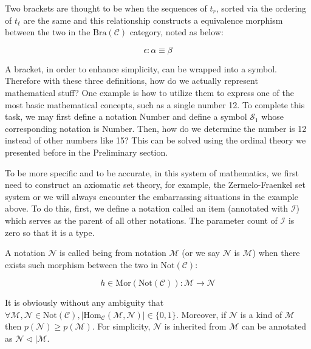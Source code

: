 \documentclass{article}
\begin{document}
Two brackets are thought to be  when the sequences of \(t_{\mathit{r}}\), sorted via the ordering of \(t_{\ell }\) are the same and this relationship constructs a equivalence morphism between the two in the \(\text{Bra}(\mathcal{C})\) category, noted as below:

\[\epsilon :\alpha \equiv \beta\]

A bracket, in order to enhance simplicity, can be wrapped into a symbol. Therefore with these three definitions, how do we actually represent mathematical stuff? One example is how to utilize them to express one of the most basic mathematical concepts, such as a single number 12. To complete this task, we may first define a notation Number and define a symbol \(\mathcal{S}_1\) whose corresponding notation is Number. Then, how do we determine the number is 12 instead of other numbers like 15? This can be solved using the ordinal theory we presented before in the Preliminary section.

To be more specific and to be accurate, in this system of mathematics, we first need to construct an axiomatic set theory, for example, the Zermelo-Fraenkel set system or we will always encounter the embarrassing situations in the example above. To do this, first, we define a notation called an item (annotated with \(\mathcal{I}\)) which serves as the parent of all other notations. The parameter count of \(\mathcal{I}\) is zero so that it is a type.

 A notation \(\mathcal{N}\) is called being  from notation \(\mathcal{M}\) (or we say \(\mathcal{N}\) is \(\mathcal{M}\)) when there exists such morphism between the two in \(\text{Not}(\mathcal{C})\):

\[h\in \text{Mor}(\text{Not}(\mathcal{C})): \mathcal{M}\to \mathcal{N}\]

It is obviously without any ambiguity that \(\forall \mathcal{M},\mathcal{N}\in \text{Not}(\mathcal{C}),\left|\text{Hom}_{\mathcal{C}}(\mathcal{M},\mathcal{N})\right|\in \{0,1\}\). Moreover, if \(\mathcal{N}\) is a kind of \(\mathcal{M}\) then \(\mathit{p}(\mathcal{N})\geq \mathit{p}(\mathcal{M})\). For simplicity, \(\mathcal{N}\) is inherited from \(\mathcal{M}\) can be annotated as \(\mathcal{N}\triangleleft |\mathcal{M}\).
\end{document}
